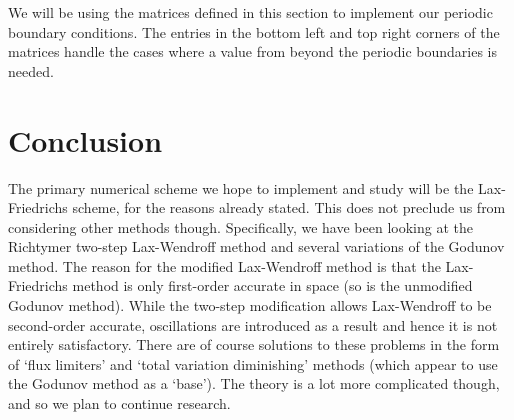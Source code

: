 \documentclass{myproject}
\begin{document}
We will be using the matrices defined in this section to implement our periodic boundary conditions. The entries in the bottom left and top right corners of the matrices handle the cases where a value from beyond the periodic boundaries is needed.

\section{Conclusion}

The primary numerical scheme we hope to implement and study will be the Lax-Friedrichs scheme, for the reasons already stated. This does not preclude us from considering other methods though. Specifically, we have been looking at the Richtymer two-step Lax-Wendroff method and several variations of the Godunov method. The reason for the modified Lax-Wendroff method is that the Lax-Friedrichs method is only first-order accurate in space (so is the unmodified Godunov method). While the two-step modification allows Lax-Wendroff to be second-order accurate, oscillations are introduced as a result and hence it is not entirely satisfactory. There are of course solutions to these problems in the form of `flux limiters' and `total variation diminishing' methods (which appear to use the Godunov method as a `base'). The theory is a lot more complicated though, and so we plan to continue research.

\nocite{iserles2009}
\nocite{leveque1992}
\nocite{leveque2002}
\printbibliography
\end{document}
